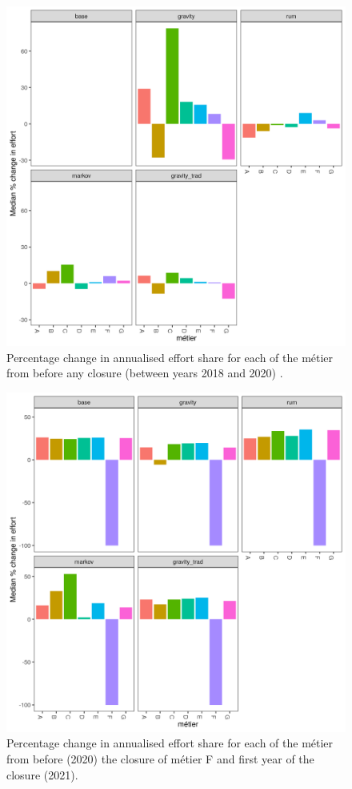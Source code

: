 \documentclass[12pt, halfline, a4paper]{ouparticle}
\begin{document}
\begin{figure}[!ht]
	\centering
	\includegraphics[width=1\linewidth]{figures/Change_effort_before}
	\caption{Percentage change in annualised effort share for each of the
		métier from before any closure (between years 2018 and 2020) .} 
	\label{fig:effort_before}
\end{figure}	

\begin{figure}[!ht]
	\centering
	\includegraphics[width=1\linewidth]{figures/Change_effort}
	\caption{Percentage change in annualised effort share for each of the
		métier from before (2020) the closure of métier F and first
		year of the closure (2021).} 
	\label{fig:effort_chg}
\end{figure}	
\end{document}
